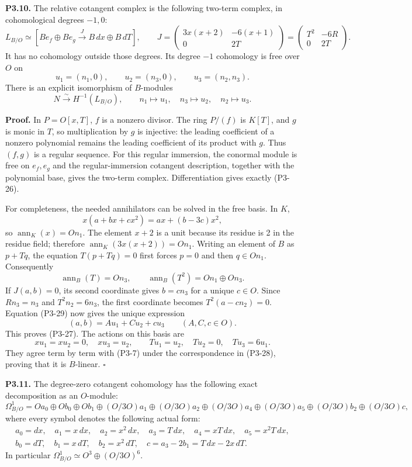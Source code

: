 \documentclass[
]{article}
\begin{document}
\textbf{P3.10.} The relative cotangent complex is the following two-term
complex, in cohomological degrees \(-1,0\): \[
L_{B/O}\simeq
\left[B e_f\oplus B e_g
\xrightarrow{J}B\,dx\oplus B\,dT\right],
\qquad
J=\begin{pmatrix}
3x(x+2)&-6(x+1)\\0&2T
\end{pmatrix}
=\begin{pmatrix}T^2&-6R\\0&2T\end{pmatrix}.
\tag{P3-26}
\] It has no cohomology outside those degrees. Its degree \(-1\)
cohomology is free over \(O\) on \[
u_1=(n_1,0),\qquad u_2=(n_3,0),\qquad
u_3=(n_2,n_3).
\tag{P3-27}
\] There is an explicit isomorphism of \(B\)-modules \[
N\xrightarrow{\sim}H^{-1}(L_{B/O}),
\qquad n_1\mapsto u_1,\quad n_3\mapsto u_2,\quad n_2\mapsto u_3.
\tag{P3-28}
\]

\textbf{Proof.} In \(P=O[x,T]\), \(f\) is a nonzero divisor. The ring
\(P/(f)\) is \(K[T]\), and \(g\) is monic in \(T\), so multiplication by
\(g\) is injective: the leading coefficient of a nonzero polynomial
remains the leading coefficient of its product with \(g\). Thus
\((f,g)\) is a regular sequence. For this regular immersion, the
conormal module is free on \(e_f,e_g\) and the regular-immersion
cotangent description, together with the polynomial base, gives the
two-term complex. Differentiation gives exactly (P3-26).

For completeness, the needed annihilators can be solved in the free
basis. In \(K\), \[
x(a+bx+cx^2)=ax+(b-3c)x^2,
\] so \(\operatorname{ann}_K(x)=On_1\). The element \(x+2\) is a unit
because its residue is 2 in the residue field; therefore
\(\operatorname{ann}_K(3x(x+2))=On_1\). Writing an element of \(B\) as
\(p+Tq\), the equation \(T(p+Tq)=0\) first forces \(p=0\) and then
\(q\in On_1\). Consequently \[
\operatorname{ann}_B(T)=On_3,\qquad
\operatorname{ann}_B(T^2)=On_1\oplus On_3.
\tag{P3-29}
\] If \(J(a,b)=0\), its second coordinate gives \(b=cn_3\) for a unique
\(c\in O\). Since \(Rn_3=n_3\) and \(T^2n_2=6n_3\), the first coordinate
becomes \(T^2(a-cn_2)=0\). Equation (P3-29) now gives the unique
expression \[
(a,b)=Au_1+Cu_2+cu_3\qquad(A,C,c\in O).
\] This proves (P3-27). The actions on this basis are \[
xu_1=xu_2=0,\quad xu_3=u_2,\qquad
Tu_1=u_2,\quad Tu_2=0,\quad Tu_3=6u_1.
\] They agree term by term with (P3-7) under the correspondence in
(P3-28), proving that it is \(B\)-linear. \(\square\)

\textbf{P3.11.} The degree-zero cotangent cohomology has the following
exact decomposition as an \(O\)-module: \[
\Omega^1_{B/O}
=Oa_0\oplus Ob_0\oplus Ob_1
\oplus(O/3O)a_1\oplus(O/3O)a_2
\oplus(O/3O)a_4\oplus(O/3O)a_5
\oplus(O/3O)b_2\oplus(O/3O)c,
\tag{P3-30}
\] where every symbol denotes the following actual form: \[
\begin{gathered}
a_0=dx,\quad a_1=x\,dx,\quad a_2=x^2\,dx,\quad
a_3=T\,dx,\quad a_4=xT\,dx,\quad a_5=x^2T\,dx,\\
b_0=dT,\quad b_1=x\,dT,\quad b_2=x^2\,dT,\quad
c=a_3-2b_1=T\,dx-2x\,dT.
\end{gathered}
\tag{P3-31}
\] In particular \(\Omega^1_{B/O}\simeq O^3\oplus(O/3O)^6\).
\end{document}
